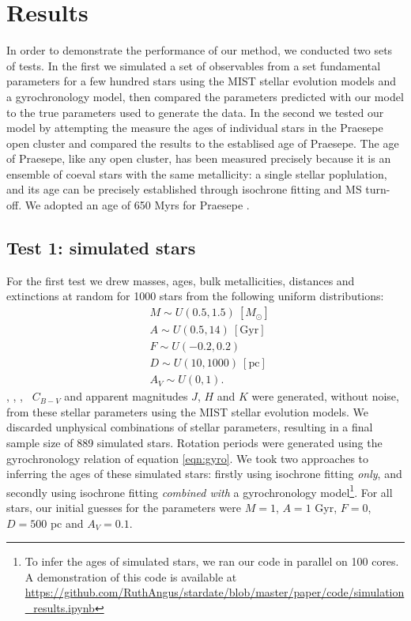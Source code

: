 \section{Results}
\label{section:results}

In order to demonstrate the performance of our method, we conducted two sets
of tests.
In the first we simulated a set of observables from a set fundamental
parameters for a few hundred stars using the MIST stellar evolution models and
a gyrochronology model, then compared the parameters predicted with our model
to the true parameters used to generate the data.
In the second we tested our model by attempting the measure the ages of
individual stars in the Praesepe open cluster and compared the results to the
establised age of Praesepe.
The age of Praesepe, like any open cluster, has been measured precisely
because it is an ensemble of coeval stars with the same metallicity: a single
stellar poplulation, and its age can be precisely established through
isochrone fitting and MS turn-off.
We adopted an age of 650 Myrs for Praesepe \citep{fossati2008}.

\subsection{Test 1: simulated stars}
For the first test we drew masses, ages, bulk metallicities, distances and
extinctions at random for 1000 stars from the following uniform distributions:
\begin{eqnarray}
& M \sim U(0.5, 1.5)~[M_\odot] \\
& A \sim U(0.5, 14)\mathrm{~[Gyr]} \\
& F \sim U(-0.2, 0.2) \\
& D \sim U(10, 1000)~\mathrm{[pc]} \\
& A_V \sim U(0, 1).
\end{eqnarray}
\teff, \logg, \fhat, \pmega\, $C_{B-V}$ and apparent magnitudes $J$, $H$ and
$K$ were generated, without noise, from these stellar parameters using the
MIST stellar evolution models.
We discarded unphysical combinations of stellar parameters, resulting in a
final sample size of 889 simulated stars.
Rotation periods were generated using the gyrochronology relation of
equation \ref{eqn:gyro}.
We took two approaches to inferring the ages of these simulated stars:
firstly using isochrone fitting {\it only}, and secondly using isochrone
fitting {\it combined with} a gyrochronology model\footnote{To infer the
ages of simulated stars, we ran our code in parallel on 100 cores. A
demonstration of this code is available at
\url{https://github.com/RuthAngus/stardate/blob/master/paper/code/simulation_results.ipynb}}.
For all stars, our initial guesses for the parameters were $M = 1$,
$A = 1$ Gyr, $F = 0$, $D = 500$ pc and $A_V = 0.1$.

